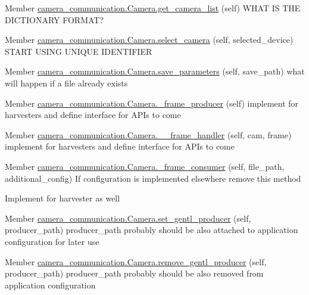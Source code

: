 
\begin{DoxyRefList}
\item[Member \mbox{\hyperlink{classcamera__communication_1_1_camera_aaef32dd93447a6a9b572e0455baf4c66}{camera\+\_\+communication.Camera.get\+\_\+camera\+\_\+list}} (self)]\label{todo__todo000001}%
%
W\+H\+AT IS T\+HE D\+I\+C\+T\+I\+O\+N\+A\+RY F\+O\+R\+M\+AT? 
\item[Member \mbox{\hyperlink{classcamera__communication_1_1_camera_a041b628e446701c28d67247286d84cc9}{camera\+\_\+communication.Camera.select\+\_\+camera}} (self, selected\+\_\+device)]\label{todo__todo000002}%
%
S\+T\+A\+RT U\+S\+I\+NG U\+N\+I\+Q\+UE I\+D\+E\+N\+T\+I\+F\+I\+ER 
\item[Member \mbox{\hyperlink{classcamera__communication_1_1_camera_aa08a0b6efcfea702d38c5a7abe7c0619}{camera\+\_\+communication.Camera.save\+\_\+parameters}} (self, save\+\_\+path)]\label{todo__todo000003}%
%
what will happen if a file already exists 
\item[Member \mbox{\hyperlink{classcamera__communication_1_1_camera_a5fa247aa3e69c9a3cbb48babeb48e9bf}{camera\+\_\+communication.Camera.\+\_\+frame\+\_\+producer}} (self)]\label{todo__todo000004}%
%
implement for harvesters and define interface for A\+P\+Is to come 
\item[Member \mbox{\hyperlink{classcamera__communication_1_1_camera_a78756e70d46874d557fd51ea9bb5affd}{camera\+\_\+communication.Camera.\+\_\+\+\_\+frame\+\_\+handler}} (self, cam, frame)]\label{todo__todo000005}%
%
implement for harvesters and define interface for A\+P\+Is to come 
\item[Member \mbox{\hyperlink{classcamera__communication_1_1_camera_a01758ed734999a6073677ee5a210124c}{camera\+\_\+communication.Camera.\+\_\+frame\+\_\+consumer}} (self, file\+\_\+path, additional\+\_\+config)]\label{todo__todo000006}%
%
If configuration is implemented elsewhere remove this method 

\label{todo__todo000007}%
%
Implement for harvester as well 
\item[Member \mbox{\hyperlink{classcamera__communication_1_1_camera_acd7e2628d6a5cc064d15b9c1487834a8}{camera\+\_\+communication.Camera.set\+\_\+gentl\+\_\+producer}} (self, producer\+\_\+path)]\label{todo__todo000008}%
%
producer\+\_\+path probably should be also attached to application configuration for later use 
\item[Member \mbox{\hyperlink{classcamera__communication_1_1_camera_a3cce78f3c2c20b0adc02e8b779dc7fd0}{camera\+\_\+communication.Camera.remove\+\_\+gentl\+\_\+producer}} (self, producer\+\_\+path)]\label{todo__todo000009}%
%
producer\+\_\+path probably should be also removed from application configuration
\end{DoxyRefList}